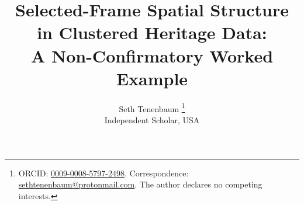 \documentclass[12pt,a4paper]{article}
\begin{document}

\title{Selected-Frame Spatial Structure in Clustered Heritage Data:\\[4pt]
A Non-Confirmatory Worked Example}


\author{Seth Tenenbaum%
  \thanks{ORCID: \href{https://orcid.org/0009-0008-5797-2498}{0009-0008-5797-2498}.
  Correspondence: \href{mailto:sethtenenbaum@protonmail.com}{sethtenenbaum@protonmail.com}.
  The author declares no competing interests.}\\[2pt]
  \small Independent Scholar, USA}

\date{}
\maketitle
\end{document}
